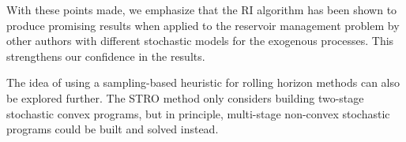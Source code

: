 With these points made, we emphasize that the RI algorithm has been shown to produce promising results when applied to the reservoir management problem by other authors with different stochastic models for the exogenous processes. This strengthens our confidence in the results.



The idea of using a sampling-based heuristic for rolling horizon methods can also be explored further. The STRO method only considers building two-stage stochastic convex programs, but in principle, multi-stage non-convex stochastic programs could be built and solved instead.



